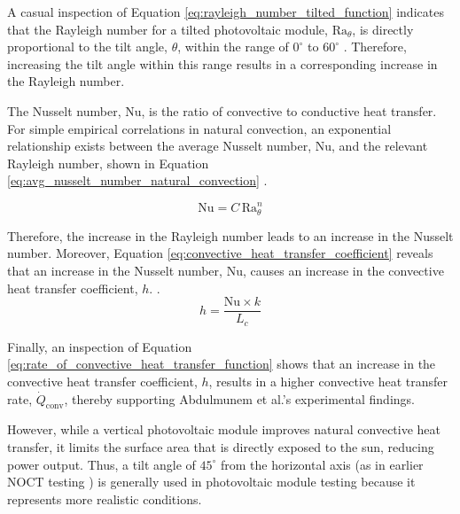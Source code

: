 A casual inspection of Equation \ref{eq:rayleigh_number_tilted_function} indicates that the Rayleigh number for a tilted photovoltaic module, $\text{Ra}_\theta$, is directly proportional to the tilt angle, $\theta$, within the range of $0^\circ$ to $60^\circ$ \cite{Cengel2014NaturalConvection}. Therefore, increasing the tilt angle within this range results in a corresponding increase in the Rayleigh number.\vspace{0.5em}

The Nusselt number, $\text{Nu}$, is the ratio of convective to conductive heat transfer. \cite{Basu2019MassMeter} For simple empirical correlations in natural convection, an exponential relationship exists between the average Nusselt number, $\text{Nu}$, and the relevant Rayleigh number, shown in Equation \ref{eq:avg_nusselt_number_natural_convection} \cite{Cengel2014NaturalConvection}.

\begin{equation}
    \text{Nu} = C\,\text{Ra}_\theta^n
    \label{eq:avg_nusselt_number_natural_convection}
\end{equation}

Therefore, the increase in the Rayleigh number leads to an increase in the Nusselt number. Moreover, Equation \ref{eq:convective_heat_transfer_coefficient} reveals that an increase in the Nusselt number, $\text{Nu}$, causes an increase in the convective heat transfer coefficient, $h$. \cite{Cengel2014NaturalConvection}.
\begin{equation}
    h = \frac{\text{Nu} \times k}{L_c}
    \label{eq:convective_heat_transfer_coefficient}
\end{equation}

Finally, an inspection of Equation \ref{eq:rate_of_convective_heat_transfer_function} shows that an increase in the convective heat transfer coefficient, $h$, results in a higher convective heat transfer rate, $\dot{Q}_\text{conv}$, thereby supporting Abdulmunem et al.'s experimental findings. \cite{Cengel2014IntroductionConcepts} \vspace{0.5em}

However, while a vertical photovoltaic module improves natural convective heat transfer, it limits the surface area that is directly exposed to the sun, reducing power output. Thus, a tilt angle of $45^\circ$ from the horizontal axis (as in earlier NOCT testing \cite{InternationalElectrotechnicalCommission2005IECApproval}) is generally used in photovoltaic module testing because it represents more realistic conditions.\vspace{0.5em}

